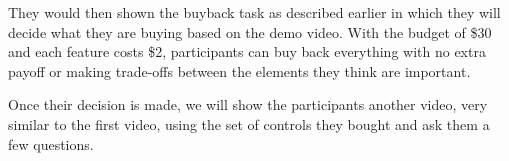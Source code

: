 They would then shown the buyback task as described earlier
in which they will decide
what they are buying
based on the demo video.
With the budget of \$30 and each feature costs \$2,
participants can buy back everything with no extra payoff
or making trade-offs between the elements they think are important.

Once their decision is made,
we will show the participants another video, 
very similar to the first video,
using the set of controls they bought
and ask them a few questions.






